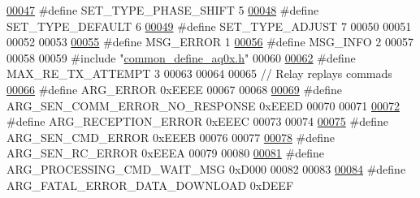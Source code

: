 \begin{DoxyCode}
\hypertarget{a00090_source_l00047}{}\hyperlink{a00090_ada31d976cd5e22a05ba8ff5e80c16d06}{00047} \textcolor{preprocessor}{#define SET\_TYPE\_PHASE\_SHIFT                                    5}
\hypertarget{a00090_source_l00048}{}\hyperlink{a00090_afd1036bf6329d2ac31913e14c1f56725}{00048} \textcolor{preprocessor}{#define SET\_TYPE\_DEFAULT                                        6}
\hypertarget{a00090_source_l00049}{}\hyperlink{a00090_a16b6b7b5ad68ec0dd62a3c9e97f88adb}{00049} \textcolor{preprocessor}{#define SET\_TYPE\_ADJUST                                         7}
00050 
00051 
00052 
00053 
\hypertarget{a00090_source_l00055}{}\hyperlink{a00090_aa8a990825a5a62c89d2fb8b08d8a1070}{00055} \textcolor{preprocessor}{#define MSG\_ERROR                                   1}
\hypertarget{a00090_source_l00056}{}\hyperlink{a00090_a1ddcc97224a95cec04b38b0ac866fa19}{00056} \textcolor{preprocessor}{#define MSG\_INFO                                    2}
00057 
00058 
00059 \textcolor{preprocessor}{#include "\hyperlink{a00086}{common\_define\_aq0x.h}"}
00060 
\hypertarget{a00090_source_l00062}{}\hyperlink{a00090_ae024113875b4670b57f70611ff982543}{00062} \textcolor{preprocessor}{#define MAX\_RE\_TX\_ATTEMPT                         3}
00063 
00064 
00065 \textcolor{comment}{// Relay replays commads}
\hypertarget{a00090_source_l00066}{}\hyperlink{a00090_a098c8517207326db0313f33ac7c6fdd8}{00066} \textcolor{preprocessor}{#define ARG\_ERROR                                   0xEEEE}
00067 
00068 
\hypertarget{a00090_source_l00069}{}\hyperlink{a00090_a5f745a08fe4d5a8336a8fd62c30e0642}{00069} \textcolor{preprocessor}{#define ARG\_SEN\_COMM\_ERROR\_NO\_RESPONSE              0xEEED}
00070 
00071 
\hypertarget{a00090_source_l00072}{}\hyperlink{a00090_a6c0eafe3de1c9e7ecff5c4f93db9ab7b}{00072} \textcolor{preprocessor}{#define ARG\_RECEPTION\_ERROR                         0xEEEC}
00073 
00074 
\hypertarget{a00090_source_l00075}{}\hyperlink{a00090_a9922eac72168ff3c8ee0b273de724049}{00075} \textcolor{preprocessor}{#define ARG\_SEN\_CMD\_ERROR                           0xEEEB}
00076 
00077 
\hypertarget{a00090_source_l00078}{}\hyperlink{a00090_a2663000c914acad476f44813681c6b5e}{00078} \textcolor{preprocessor}{#define ARG\_SEN\_RC\_ERROR                            0xEEEA}
00079 
00080 
\hypertarget{a00090_source_l00081}{}\hyperlink{a00090_a89228259ebf351e938853637ef163a1b}{00081} \textcolor{preprocessor}{#define ARG\_PROCESSING\_CMD\_WAIT\_MSG                 0xD000}
00082 
00083 
\hypertarget{a00090_source_l00084}{}\hyperlink{a00090_aedd62437ce5e337b31be5ae516039725}{00084} \textcolor{preprocessor}{#define ARG\_FATAL\_ERROR\_DATA\_DOWNLOAD               0xDEEF}

\end{DoxyCode}
